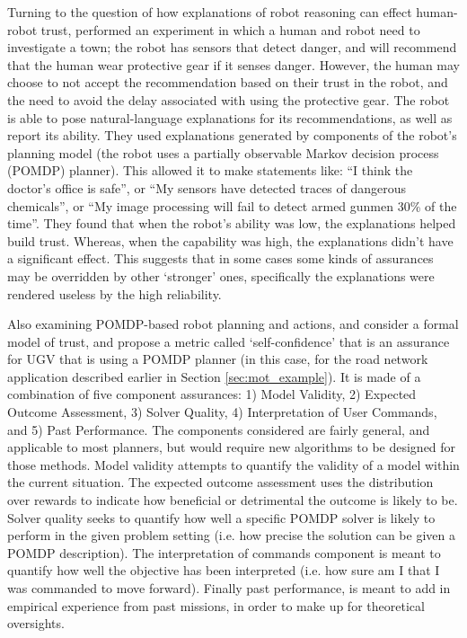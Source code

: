 Turning to the question of how explanations of robot reasoning can effect human-robot trust,  \citet{Wang2016-id} performed an experiment in which a human and robot need to investigate a town; the robot has sensors that detect danger, and will recommend that the human wear protective gear if it senses danger. However, the human may choose to not accept the recommendation based on their trust in the robot, and the need to avoid the delay associated with using the protective gear. The robot is able to pose natural-language explanations for its recommendations, as well as report its ability. They used explanations generated by components of the robot's planning model (the robot uses a partially observable Markov decision process (POMDP) planner). This allowed it to make statements like: ``I think the doctor's office is safe'', or ``My sensors have detected traces of dangerous chemicals'', or ``My image processing will fail to detect armed gunmen 30\% of the time''. They found that when the robot's ability was low, the explanations helped build trust. Whereas, when the capability was high, the explanations didn't have a significant effect. This suggests that in some cases some kinds of assurances may be overridden by other `stronger' ones, specifically the explanations were rendered useless by the high reliability. 

Also examining POMDP-based robot planning and actions, \citet{Aitken2016-fb} and \citet{Aitken2016-cv} consider a formal model of trust, and propose a metric called `self-confidence' that is an assurance for UGV that is using a  POMDP planner (in this case, for the road network application described earlier in Section \ref{sec:mot_example}). It is made of a combination of five component assurances: 1) Model Validity, 2) Expected Outcome Assessment, 3) Solver Quality, 4) Interpretation of User Commands, and 5) Past Performance. The components considered are fairly general, and applicable to most planners, but would require new algorithms to be designed for those methods. Model validity attempts to quantify the validity of a model within the current situation. The expected outcome assessment uses the distribution over rewards to indicate how beneficial or detrimental the outcome is likely to be. Solver quality seeks to quantify how well a specific POMDP solver is likely to perform in the given problem setting (i.e. how precise the solution can be given a POMDP description). The interpretation of commands component is meant to quantify how well the objective has been interpreted (i.e. how sure am I that I was commanded to move forward). Finally past performance, is meant to add in empirical experience from past missions, in order to make up for theoretical oversights.

